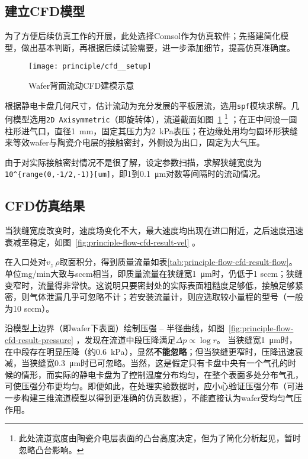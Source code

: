 \subsection{建立CFD模型}\label{sec:principle-flow-cfd-setup}

为了方便后续仿真工作的开展，此处选择Comsol作为仿真软件；先搭建简化模型，做出基本判断，再根据后续试验需要，进一步添加细节，提高仿真准确度。

\begin{figure}[hbt]
\centering
\texttt{[image: principle/cfd\_\_setup]}
\caption[CFD建模示意]{Wafer背面流动CFD建模示意}
\label{fig:principle-flow-cfd-setup}
\end{figure}

根据静电卡盘几何尺寸，估计流动为充分发展的平板层流，选用\verb|spf|模块求解。几何模型选用\verb|2D Axisymmetric|（即旋转体），流道截面如图~\ref{fig:principle-flow-cfd-setup} 
\footnote{此处流道宽度由陶瓷介电层表面的凸台高度决定，但为了简化分析起见，暂时忽略凸台影响。}
；在正中间设一圆柱形进气口，直径\SI{1}{\mm}，固定其压力为\SI{2}{\kPa}表压；在边缘处用均匀圆环形狭缝来等效wafer与陶瓷介电层的接触密封，外侧设为出口，固定为大气压。

由于对实际接触密封情况不是很了解，设定参数扫描，求解狭缝宽度为\verb|10^{range(0,-1/2,-1)}[um]|，即1到\SI{0.1}{\micro\meter}对数等间隔时的流动情况。


\subsection{CFD仿真结果}\label{sec:principle-flow-cfd-result}

当狭缝宽度改变时，速度场变化不大，最大速度均出现在进口附近，之后速度迅速衰减至稳定，如图~\ref{fig:principle-flow-cfd-result-vel} 。


在入口处对$v_z\ \rho$取面积分，得到质量流量如表\ref{tab:principle-flow-cfd-result-flow}。单位\si[per-mode=symbol]{\mg\per\minute}大致与sccm相当，即质量流量在狭缝宽\SI{1}{\micro\meter}时，仍低于1 sccm；狭缝变窄时，流量得非常快。这说明只要密封处的实际表面粗糙度足够低，接触足够紧密，则气体泄漏几乎可忽略不计；若安装流量计，则应选取较小量程的型号（一般为10 sccm）。

沿模型上边界（即wafer下表面）绘制压强 -- 半径曲线，如图~\ref{fig:principle-flow-cfd-result-pressure} ，发现在流道中段压降满足$\Delta p \propto \log{r}$。 %
当狭缝宽\SI{1}{\micro\meter}时，在中段存在明显压降（约\SI{0.6}{\kPa}），显然\textbf{不能忽略}；但当狭缝更窄时，压降迅速衰减，当狭缝宽\SI{0.3}{\micro\meter}时已可忽略。当然，这是假定只有卡盘中央有一个气孔的时候的情形，而实际的静电卡盘为了控制温度分布均匀，在整个表面多处分布气孔，可使压强分布更均匀。即便如此，在处理实验数据时，应小心验证压强分布（可进一步构建三维流道模型以得到更准确的仿真数据），不能直接认为wafer受均匀气压作用。

